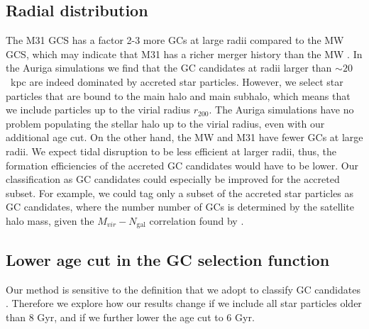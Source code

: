\documentclass[a4paper,fleqn,usenatbib]{mnras}
\newcommand{\Sun}[0]{\ensuremath{_{\odot}}}
\begin{document}
\subsection{Radial distribution}
\label{sec:discussion_Rgc}
The M31 GCS has a factor 2-3 more GCs at large radii compared to the MW GCS,
which may indicate that M31 has a richer merger history than the MW 
\citep{2016ApJ...824...42C}. In the Auriga simulations we find that the GC 
candidates at radii larger than ${\sim}20$~kpc are indeed dominated by accreted
star particles. However, we select star particles that are bound to the main 
halo and main subhalo, which means that we include particles up to the virial 
radius $r_{200}$. The Auriga simulations have no problem populating the stellar 
halo up to the virial radius, even with our additional age cut. On the other hand, 
the MW and M31 have fewer GCs at large radii. We expect tidal disruption to be
less efficient at larger radii, thus, the formation efficiencies of the accreted 
GC candidates would have to be lower. Our classification as GC candidates could
especially be improved for the accreted subset. For example, we could tag only a
subset of the accreted star particles as GC candidates, where the number
number of GCs is determined by the satellite halo mass, given the 
$M_{vir}-N_{\text{gal}}$ correlation found by \citet{2019arXiv190100900B}.


\subsection{Lower age cut in the GC selection function}
\label{sec:age_min}
Our method is sensitive to the definition that we adopt to classify GC candidates
\citep{2010MNRAS.404.1203F}. Therefore we explore how our results change if we 
include all star particles older than 8 Gyr, and if we further lower the age cut 
to 6 Gyr. 
\end{document}

